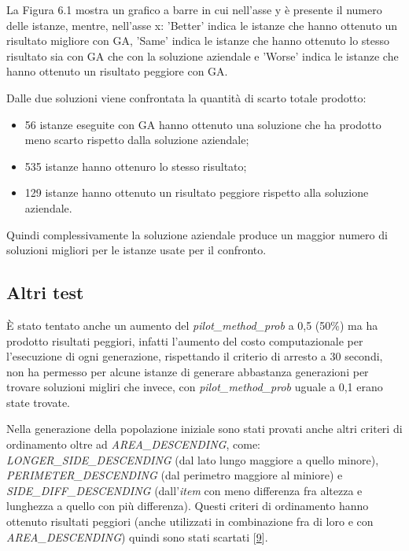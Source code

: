 La Figura 6.1 mostra un grafico a barre in cui nell'asse y è presente il numero delle istanze, mentre, nell'asse x: 'Better' indica le istanze che hanno ottenuto un risultato migliore con GA, 'Same' indica le istanze che hanno ottenuto lo stesso risultato sia con GA che con la soluzione aziendale e 'Worse' indica le istanze che hanno ottenuto un risultato peggiore con GA.

Dalle due soluzioni viene confrontata la quantità di scarto totale prodotto:
\begin{itemize}
    \item 56 istanze eseguite con GA hanno ottenuto una soluzione che ha prodotto meno scarto rispetto dalla soluzione aziendale;
    \item 535 istanze hanno ottenuro lo stesso risultato;
    \item 129 istanze hanno ottenuto un risultato peggiore rispetto alla soluzione aziendale.
\end{itemize}

Quindi complessivamente la soluzione aziendale produce un maggior numero di soluzioni migliori per le istanze usate per il confronto.

\subsection{Altri test} \hypertarget{chiara3}{}

È stato tentato anche un aumento del \emph{pilot\_method\_prob} a 0,5 (50\%) ma ha prodotto risultati peggiori, infatti l'aumento del costo computazionale per l'esecuzione di ogni generazione, rispettando il criterio di arresto a 30 secondi, non ha permesso per alcune istanze di generare abbastanza generazioni per trovare soluzioni migliri che invece, con \emph{pilot\_method\_prob} uguale a 0,1 erano state trovate.

Nella generazione della popolazione iniziale sono stati provati anche altri criteri di ordinamento oltre ad \emph{AREA\_DESCENDING}, come: \emph{LONGER\_SIDE\_DESCENDING} (dal lato lungo maggiore a quello minore), \emph{PERIMETER\_DESCENDING} (dal perimetro maggiore al miniore) e \emph{SIDE\_DIFF\_DESCENDING} (dall'\emph{item} con meno differenza fra altezza e lunghezza a quello con più differenza). Questi criteri di ordinamento hanno ottenuto risultati peggiori (anche utilizzati in combinazione fra di loro e con \emph{AREA\_DESCENDING}) quindi sono stati scartati [\hyperlink{bibliografia}{9}]. 